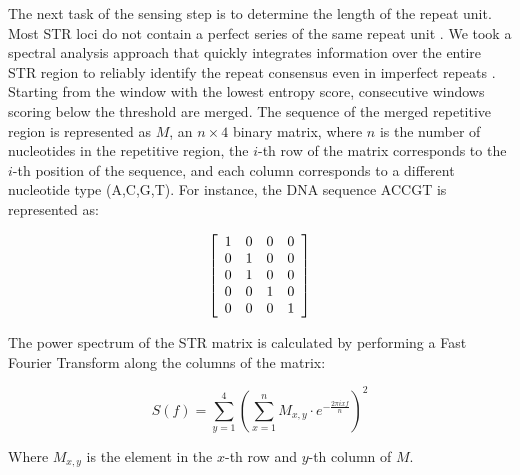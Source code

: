 The next task of the sensing step is to determine the length of the repeat unit. Most STR loci do not contain a perfect series of the same repeat unit \cite{Benson1999}. We took a spectral analysis approach that quickly integrates information over the entire STR region to reliably identify the repeat consensus even in imperfect repeats \cite{SharmaIssacRaghavaEtAl2004}. Starting from the window with the lowest entropy score, consecutive windows scoring below the threshold are merged. The sequence of the merged repetitive region is represented as $M$, an $n \times 4$ binary matrix, where $n$ is the number of nucleotides in the repetitive region, the $i$-th row of the matrix corresponds to the $i$-th position of the sequence, and each column corresponds to a different nucleotide type (A,C,G,T). For instance, the DNA sequence ACCGT is represented as:

\begin{equation}
\left[
\begin{array}{c c c c}
1 & 0 & 0 & 0 \\
0 & 1 & 0 & 0 \\
0 & 1 & 0 & 0 \\
0 & 0 & 1 & 0 \\
0 & 0 & 0 & 1 \\
\end{array}
\right]
\end{equation}

The power spectrum of the STR matrix is calculated by performing a Fast Fourier Transform along the columns of the matrix:

\begin{equation}
S(f) = \sum_{y=1}^4 \left( \sum_{x=1}^n M_{x,y} \cdot e^{-\frac{2\pi ixf}{n}} \right) ^2
\end{equation}

Where $M_{x,y}$ is the element in the $x$-th row and $y$-th column of $M$.

